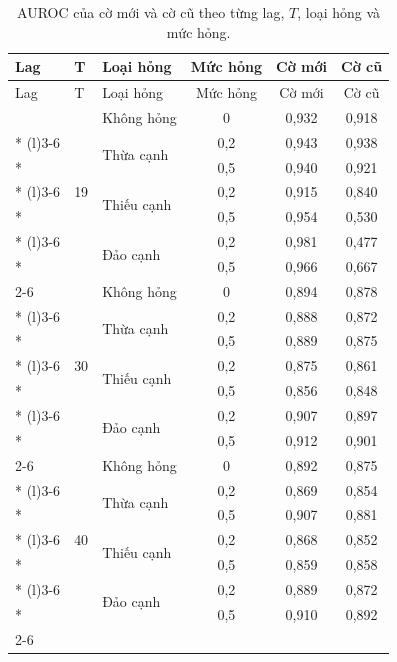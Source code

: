 {\small
\begin{longtable}{lllccc}
\caption{AUROC của cờ mới và cờ cũ theo từng lag, $T$, loại hỏng và mức hỏng.}\label{tab:flag}\\
\toprule
Lag & T & Loại hỏng & Mức hỏng & Cờ mới & Cờ cũ \\
\midrule
\endfirsthead
\toprule
Lag & T & Loại hỏng & Mức hỏng & Cờ mới & Cờ cũ \\
\midrule
\endhead
\bottomrule
\endfoot
\multirow{35}{*}{1} & \multirow{7}{*}{19} & \multirow{1}{*}{Không hỏng} & 0 & 0,932 & 0,918 \\*
\cmidrule(l){3-6}
 &  & \multirow{2}{*}{Thừa cạnh} & 0,2 & 0,943 & 0,938 \\*
 &  &  & 0,5 & 0,940 & 0,921 \\*
\cmidrule(l){3-6}
 &  & \multirow{2}{*}{Thiếu cạnh} & 0,2 & 0,915 & 0,840 \\*
 &  &  & 0,5 & 0,954 & 0,530 \\*
\cmidrule(l){3-6}
 &  & \multirow{2}{*}{Đảo cạnh} & 0,2 & 0,981 & 0,477 \\*
 &  &  & 0,5 & 0,966 & 0,667 \\
\cmidrule(l){2-6}
 & \multirow{7}{*}{30} & \multirow{1}{*}{Không hỏng} & 0 & 0,894 & 0,878 \\*
\cmidrule(l){3-6}
 &  & \multirow{2}{*}{Thừa cạnh} & 0,2 & 0,888 & 0,872 \\*
 &  &  & 0,5 & 0,889 & 0,875 \\*
\cmidrule(l){3-6}
 &  & \multirow{2}{*}{Thiếu cạnh} & 0,2 & 0,875 & 0,861 \\*
 &  &  & 0,5 & 0,856 & 0,848 \\*
\cmidrule(l){3-6}
 &  & \multirow{2}{*}{Đảo cạnh} & 0,2 & 0,907 & 0,897 \\*
 &  &  & 0,5 & 0,912 & 0,901 \\
\cmidrule(l){2-6}
 & \multirow{7}{*}{40} & \multirow{1}{*}{Không hỏng} & 0 & 0,892 & 0,875 \\*
\cmidrule(l){3-6}
 &  & \multirow{2}{*}{Thừa cạnh} & 0,2 & 0,869 & 0,854 \\*
 &  &  & 0,5 & 0,907 & 0,881 \\*
\cmidrule(l){3-6}
 &  & \multirow{2}{*}{Thiếu cạnh} & 0,2 & 0,868 & 0,852 \\*
 &  &  & 0,5 & 0,859 & 0,858 \\*
\cmidrule(l){3-6}
 &  & \multirow{2}{*}{Đảo cạnh} & 0,2 & 0,889 & 0,872 \\*
 &  &  & 0,5 & 0,910 & 0,892 \\
\cmidrule(l){2-6}

\end{longtable}}

